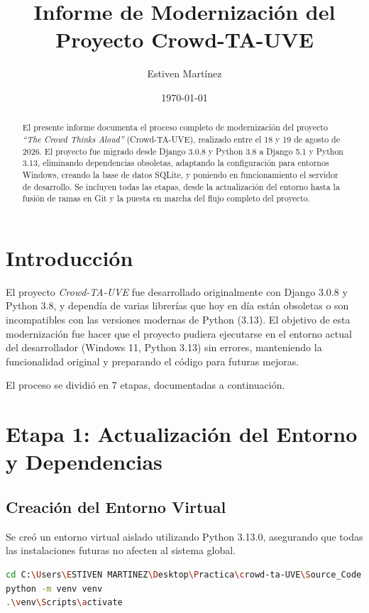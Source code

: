 \documentclass[12pt, spanish]{article}
\title{\textbf{Informe de Modernización del Proyecto Crowd-TA-UVE}}
\author{Estiven Martínez}
\date{\today}
\begin{document}
\maketitle

\begin{abstract}
El presente informe documenta el proceso completo de modernización del proyecto \textit{``The Crowd Thinks Aloud''} (Crowd-TA-UVE), realizado entre el 18 y 19 de agosto de 2026. El proyecto fue migrado desde Django 3.0.8 y Python 3.8 a Django 5.1 y Python 3.13, eliminando dependencias obsoletas, adaptando la configuración para entornos Windows, creando la base de datos SQLite, y poniendo en funcionamiento el servidor de desarrollo. Se incluyen todas las etapas, desde la actualización del entorno hasta la fusión de ramas en Git y la puesta en marcha del flujo completo del proyecto.
\end{abstract}

\section{Introducción}
El proyecto \textit{Crowd-TA-UVE} fue desarrollado originalmente con Django 3.0.8 y Python 3.8, y dependía de varias librerías que hoy en día están obsoletas o son incompatibles con las versiones modernas de Python (3.13). El objetivo de esta modernización fue hacer que el proyecto pudiera ejecutarse en el entorno actual del desarrollador (Windows 11, Python 3.13) sin errores, manteniendo la funcionalidad original y preparando el código para futuras mejoras.

El proceso se dividió en 7 etapas, documentadas a continuación.

\section{Etapa 1: Actualización del Entorno y Dependencias}
\subsection{Creación del Entorno Virtual}
Se creó un entorno virtual aislado utilizando Python 3.13.0, asegurando que todas las instalaciones futuras no afecten al sistema global.

\begin{lstlisting}[language=bash, caption={Comandos para crear y activar el entorno virtual}]
cd C:\Users\ESTIVEN MARTINEZ\Desktop\Practica\crowd-ta-UVE\Source_Code
python -m venv venv
.\venv\Scripts\activate
\end{lstlisting}
\end{document}
